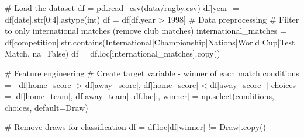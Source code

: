 \documentclass[
  letterpaper,
  DIV=11,
  numbers=noendperiod]{scrartcl}
\newenvironment{Shaded}{\begin{snugshade}}{\end{snugshade}}
\newcommand{\BuiltInTok}[1]{\textcolor[rgb]{0.00,0.23,0.31}{#1}}
\newcommand{\CommentTok}[1]{\textcolor[rgb]{0.37,0.37,0.37}{#1}}
\newcommand{\DecValTok}[1]{\textcolor[rgb]{0.68,0.00,0.00}{#1}}
\newcommand{\NormalTok}[1]{\textcolor[rgb]{0.00,0.23,0.31}{#1}}
\newcommand{\OperatorTok}[1]{\textcolor[rgb]{0.37,0.37,0.37}{#1}}
\newcommand{\StringTok}[1]{\textcolor[rgb]{0.13,0.47,0.30}{#1}}
\newcommand{\VariableTok}[1]{\textcolor[rgb]{0.07,0.07,0.07}{#1}}
\begin{document}
\begin{Shaded}
\begin{Highlighting}[]
\CommentTok{\# Load the dataset}
\NormalTok{df }\OperatorTok{=}\NormalTok{ pd.read\_csv(}\StringTok{\textquotesingle{}data/rugby.csv\textquotesingle{}}\NormalTok{)}
\NormalTok{df[}\StringTok{\textquotesingle{}year\textquotesingle{}}\NormalTok{] }\OperatorTok{=}\NormalTok{ df[}\StringTok{\textquotesingle{}date\textquotesingle{}}\NormalTok{].}\BuiltInTok{str}\NormalTok{[}\DecValTok{0}\NormalTok{:}\DecValTok{4}\NormalTok{].astype(}\BuiltInTok{int}\NormalTok{)}
\NormalTok{df }\OperatorTok{=}\NormalTok{ df[df.year }\OperatorTok{\textgreater{}} \DecValTok{1998}\NormalTok{]}
\CommentTok{\# Data preprocessing}
\CommentTok{\# Filter to only international matches (remove club matches)}
\NormalTok{international\_matches }\OperatorTok{=}\NormalTok{ df[}\StringTok{\textquotesingle{}competition\textquotesingle{}}\NormalTok{].}\BuiltInTok{str}\NormalTok{.contains(}\StringTok{\textquotesingle{}International|Championship|Nations|World Cup|Test Match\textquotesingle{}}\NormalTok{, na}\OperatorTok{=}\VariableTok{False}\NormalTok{)}
\NormalTok{df }\OperatorTok{=}\NormalTok{ df.loc[international\_matches].copy()}

\CommentTok{\# Feature engineering}
\CommentTok{\# Create target variable {-} winner of each match}
\NormalTok{conditions }\OperatorTok{=}\NormalTok{ [}
\NormalTok{    df[}\StringTok{\textquotesingle{}home\_score\textquotesingle{}}\NormalTok{] }\OperatorTok{\textgreater{}}\NormalTok{ df[}\StringTok{\textquotesingle{}away\_score\textquotesingle{}}\NormalTok{],}
\NormalTok{    df[}\StringTok{\textquotesingle{}home\_score\textquotesingle{}}\NormalTok{] }\OperatorTok{\textless{}}\NormalTok{ df[}\StringTok{\textquotesingle{}away\_score\textquotesingle{}}\NormalTok{]}
\NormalTok{]}
\NormalTok{choices }\OperatorTok{=}\NormalTok{ [df[}\StringTok{\textquotesingle{}home\_team\textquotesingle{}}\NormalTok{], df[}\StringTok{\textquotesingle{}away\_team\textquotesingle{}}\NormalTok{]]}
\NormalTok{df.loc[:, }\StringTok{\textquotesingle{}winner\textquotesingle{}}\NormalTok{] }\OperatorTok{=}\NormalTok{ np.select(conditions, choices, default}\OperatorTok{=}\StringTok{\textquotesingle{}Draw\textquotesingle{}}\NormalTok{)}

\CommentTok{\# Remove draws for classification}
\NormalTok{df }\OperatorTok{=}\NormalTok{ df.loc[df[}\StringTok{\textquotesingle{}winner\textquotesingle{}}\NormalTok{] }\OperatorTok{!=} \StringTok{\textquotesingle{}Draw\textquotesingle{}}\NormalTok{].copy()}


\end{Highlighting}
\end{Shaded}
\end{document}
